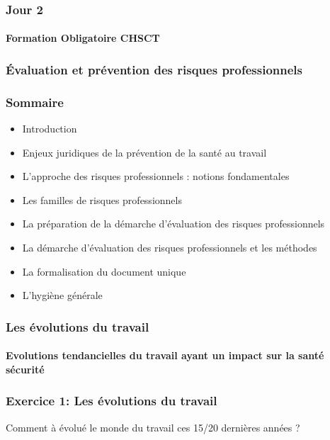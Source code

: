 \documentclass{beamer}
\begin{document}
\begin{frame}
\frametitle{Jour 2}
\framesubtitle{Formation Obligatoire CHSCT}
\end{frame}

\begin{frame}
\frametitle{Évaluation et prévention des risques professionnels}
\end{frame}

\begin{frame}
\frametitle{Sommaire}
\begin{itemize}
\item Introduction
\item Enjeux juridiques de la prévention de la santé au travail
\item L’approche des risques professionnels : notions fondamentales
\item Les familles de risques professionnels
\item La préparation de la démarche d’évaluation des risques professionnels
\item La démarche d’évaluation des risques professionnels et les méthodes
\item La formalisation du document unique
\item L’hygiène générale
\end{itemize}
\end{frame} 

\begin{frame}
\frametitle{Les évolutions du travail}
\framesubtitle{Evolutions tendancielles du travail ayant un impact sur la santé sécurité}
\end{frame} 

\begin{frame}
\frametitle{Exercice 1: Les évolutions du travail}
Comment à évolué le monde du travail ces 15/20 dernières années ?
\end{frame} 
\end{document}
